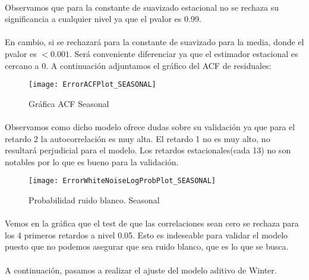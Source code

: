 \documentclass[a4paper, spanish]{article}
\begin{document}
      \paragraph{}
      Observamos que para la constante de suavizado estacional no se rechaza su significancia a cualquier nivel ya que el pvalor es 0.99.

      \paragraph{}
      En cambio, si se rechazará para la constante de suavizado para la media, donde el pvalor es $<0.001$. Será conveniente diferenciar ya que el estimador estacional es cercano a 0. A continuación adjuntamos el gráfico del ACF de residuales:

      \begin{figure}[h!]
        \centering
        \texttt{[image: ErrorACFPlot\_SEASONAL]}
        \caption{Gráfica ACF Seasonal}
        \label{}
      \end{figure}

      \paragraph{}
      Observamos como dicho modelo ofrece dudas sobre su validación ya que para el retardo 2 la autocorrelación es muy alta. El retardo 1 no es muy alto, no resultará perjudicial para el modelo. Los retardos estacionales(cada 13) no son notables por lo que es bueno para la validación.

      \begin{figure}[h!]
        \centering
        \texttt{[image: ErrorWhiteNoiseLogProbPlot\_SEASONAL]}
        \caption{Probabilidad ruido blanco. Seasonal}
        \label{}
      \end{figure}

      \paragraph{}
      Vemos en la gráfica que el test de que las correlaciones sean cero se rechaza para los 4 primeros retardos a nivel 0.05. Esto es indeseable para validar el modelo puesto que no podemos asegurar que sea ruido blanco, que es lo que se busca.

      \paragraph{}
      A continuación, pasamos a realizar el ajuste del modelo aditivo de Winter.
\end{document}

